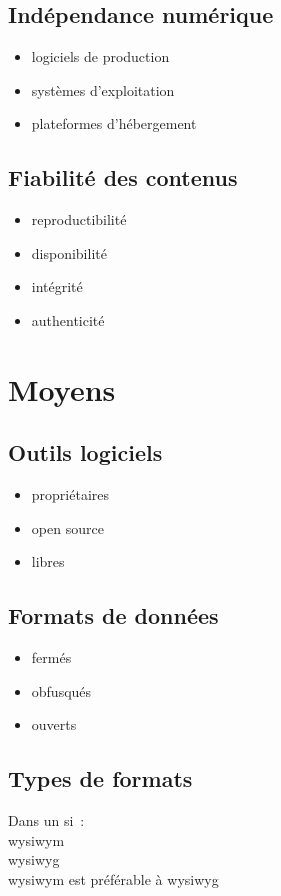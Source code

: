 \documentclass[12pt]{extarticle}
\begin{document}
\subsection{Indépendance numérique}
\begin{itemize}
\item{logiciels de production}
\item{systèmes d’exploitation}
\item{plateformes d’hébergement}
\end{itemize}

\subsection{Fiabilité des contenus}
\begin{itemize}
\item{reproductibilité}
\item{disponibilité}
\item{intégrité}
\item{authenticité}
\end{itemize}

\pagebreak
\section{Moyens}

\subsection{Outils logiciels}
\begin{itemize}
\item{propriétaires}
\item{open source}
\item{libres}
\end{itemize}

\subsection{Formats de données}
\begin{itemize}
\item{fermés}
\item{obfusqués}
\item{ouverts}
\end{itemize}

\pagebreak
\subsection{Types de formats}
Dans un \gls{si} :\\
\gls{wysiwym} \cite{wysiwym}\\
\gls{wysiwyg} \cite{wysiwyg}\\
\gls{wysiwym} est préférable à \gls{wysiwyg}
\end{document}
